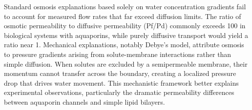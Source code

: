 Standard osmosis explanations based solely on water concentration gradients fail to account for measured flow rates that far exceed diffusion limits. The ratio of osmotic permeability to diffusive permeability (Pf/Pd) commonly exceeds 100 in biological systems with aquaporins, while purely diffusive transport would yield a ratio near 1. Mechanical explanations, notably Debye's model, attribute osmosis to pressure gradients arising from solute-membrane interactions rather than simple diffusion. When solutes are excluded by a semipermeable membrane, their momentum cannot transfer across the boundary, creating a localized pressure drop that drives water movement. This mechanistic framework better explains experimental observations, particularly the dramatic permeability differences between aquaporin channels and simple lipid bilayers.

